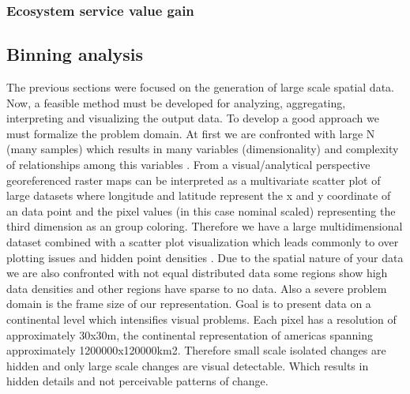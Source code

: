 		\subsubsection{Ecosystem service value gain}
			\lipsum[1]

	\subsection{Binning analysis}
		The previous sections were focused on the generation of large scale spatial data. Now, a feasible method must be developed for analyzing, aggregating, interpreting and visualizing the output data. To develop a good approach we must formalize the problem domain. At first we are confronted with large N (many samples) which results in many variables (dimensionality) and complexity of relationships among this variables \citep{Carr1990}. From a visual/analytical perspective georeferenced raster maps can be interpreted as a multivariate scatter plot of large datasets where longitude and latitude represent the x and y coordinate of an data point and the pixel values (in this case nominal scaled) representing the third dimension as an group coloring. Therefore we have a large multidimensional dataset combined with a scatter plot visualization which leads commonly to over plotting issues and hidden point densities \citep{Carr1987}. Due to the spatial nature of your data we are also confronted with not equal distributed data some regions show high data densities and other regions have sparse to no data. Also a severe problem domain is the frame size of our representation. Goal is to present data on a continental level which intensifies visual problems. Each pixel has a resolution of approximately 30x30m, the continental representation of americas spanning approximately 1200000x120000km2. Therefore small scale isolated changes are hidden and only large scale changes are visual detectable. Which results in hidden details and not perceivable patterns of change.

